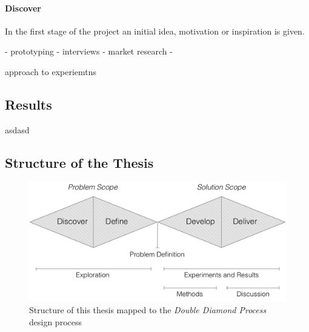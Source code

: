 \paragraph{Discover}
\label{par:Discover}

In the first stage of the project an initial idea, motivation or inspiration is given.

- prototyping
- interviews
- market research
-

approach to experiemtns



\subsection{Results}

asdasd

\subsection{Structure of the Thesis}

\begin{figure}[h]
    \centering
    \includegraphics[width=\textwidth]{img/double-diamond-with-structure}
    \caption{Structure of this thesis mapped to the \emph{Double Diamond Process} design process }
\label{fig:double-diamond-with-structure}
\end{figure}

